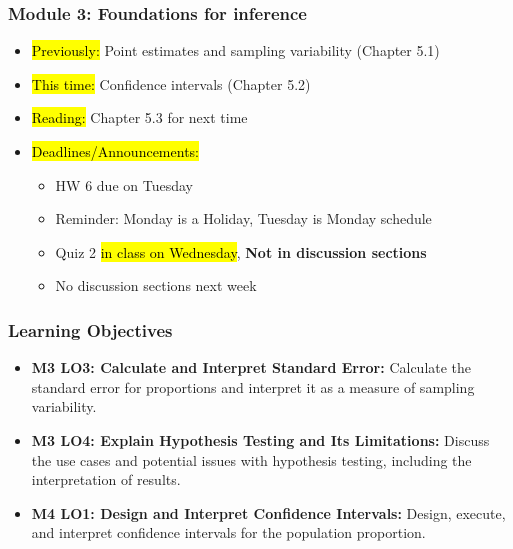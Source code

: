 \begin{frame}
    \frametitle{Module 3: Foundations for inference}
    \begin{itemize}
        \item \hl{Previously: }Point estimates and sampling variability (Chapter 5.1)
        \item \hl{This time: }Confidence intervals (Chapter 5.2)
        \item \hl{Reading: }Chapter 5.3 for next time
        \item \hl{Deadlines/Announcements: }
        \begin{itemize}
            \item HW 6 due on Tuesday
            \item Reminder: Monday is a Holiday, Tuesday is Monday schedule
            \item Quiz 2 \hl{in class on Wednesday}, \textbf{Not in discussion sections}
            \item No discussion sections next week
        \end{itemize}
    \end{itemize}
    
\end{frame}
    
\begin{frame}
\frametitle{Learning Objectives}
\begin{itemize}
    \item \textbf{M3 LO3: Calculate and Interpret Standard Error:} Calculate the standard error for proportions and interpret it as a measure of sampling variability. 
    \item \textbf{M3 LO4: Explain Hypothesis Testing and Its Limitations:} Discuss the use cases and potential issues with hypothesis testing, including the interpretation of results. 
    \item \textbf{M4 LO1: Design and Interpret Confidence Intervals:} Design, execute, and interpret confidence intervals for the population proportion. 
\end{itemize}
\end{frame}

